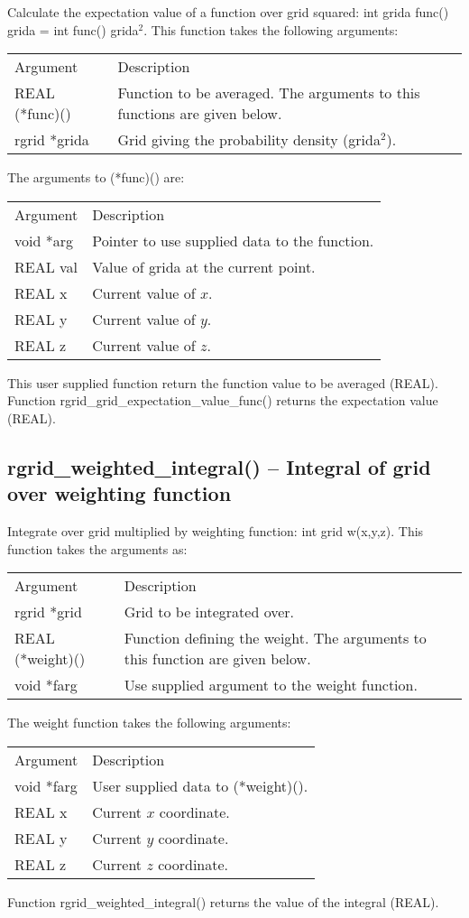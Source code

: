 \documentclass[12pt,letterpaper]{report}
\begin{document}
Calculate the expectation value of a function over grid squared: int grida func() grida = int func() grida$^2$. This function takes the following arguments:
\begin{longtable}{p{} p{}}
Argument & Description\\
\cline{1-2}
REAL (*func)() & Function to be averaged. The arguments to this functions are given below.\\
rgrid *grida & Grid giving the probability density (grida$^2$).\\
\end{longtable}
\noindent
The arguments to (*func)() are:
\begin{longtable}{p{} p{}}
Argument & Description\\
\cline{1-2}
void *arg & Pointer to use supplied data to the function.\\
REAL val & Value of grida at the current point.\\
REAL x & Current value of $x$.\\
REAL y & Current value of $y$.\\
REAL z & Current value of $z$.\\
\end{longtable}
\noindent
This user supplied function return the function value to be averaged (REAL). Function rgrid\_grid\_expectation\_value\_func() returns the expectation value (REAL).

\subsection{rgrid\_weighted\_integral() -- Integral of grid over weighting function}

Integrate over grid multiplied by weighting function: int grid w(x,y,z). This function takes the arguments as:
\begin{longtable}{p{} p{}}
Argument & Description\\
\cline{1-2}
rgrid *grid & Grid to be integrated over.\\
REAL (*weight)() & Function defining the weight. The arguments to this function are given below.\\
void *farg & Use supplied argument to the weight function.\\
\end{longtable}
\noindent
The weight function takes the following arguments:
\begin{longtable}{p{} p{}}
Argument & Description\\
\cline{1-2}
void *farg & User supplied data to (*weight)().\\
REAL x & Current $x$ coordinate.\\
REAL y & Current $y$ coordinate.\\
REAL z & Current $z$ coordinate.\\
\end{longtable}
\noindent
Function rgrid\_weighted\_integral() returns the value of the integral (REAL).
\end{document}
